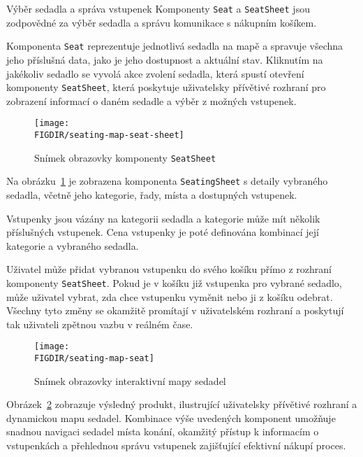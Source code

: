 \begin{subsection}{Výběr sedadla a správa vstupenek}
    \label{subsec:implementace-seating-seat}
    Komponenty \texttt{Seat} a \texttt{SeatSheet} jsou zodpovědné za výběr sedadla a správu komunikace s nákupním košíkem.

    Komponenta \texttt{Seat} reprezentuje jednotlivá sedadla na mapě a spravuje všechna jeho příslušná data, jako je jeho dostupnost a aktuální stav.
    Kliknutím na jakékoliv sedadlo se vyvolá akce zvolení sedadla, která spustí otevření komponenty \texttt{SeatSheet}, která poskytuje uživatelsky přívětivé rozhraní pro zobrazení informací o daném sedadle a výběr z možných vstupenek.

    \begin{figure}[h]
        \centering
        \texttt{[image: \\FIGDIR/seating-map-seat-sheet]}
        \caption{Snímek obrazovky komponenty \texttt{SeatSheet}}
        \label{fig:seating-map-seats-sheet}
    \end{figure}

    Na obrázku~\ref{fig:seating-map-seats-sheet} je zobrazena komponenta \texttt{SeatingSheet} s detaily vybraného sedadla, včetně jeho kategorie, řady, místa a dostupných vstupenek.

    Vstupenky jsou vázány na kategorii sedadla a kategorie může mít několik příslušných vstupenek.
    Cena vstupenky je poté definována kombinací její kategorie a vybraného sedadla.

    Uživatel může přidat vybranou vstupenku do svého košíku přímo z rozhraní komponenty \texttt{SeatSheet}.
    Pokud je v košíku již vstupenka pro vybrané sedadlo, může uživatel vybrat, zda chce vstupenku vyměnit nebo ji z košíku odebrat.
    Všechny tyto změny se okamžitě promítají v uživatelském rozhraní a poskytují tak uživateli zpětnou vazbu v reálném čase.

    \begin{figure}[h]
        \centering
        \texttt{[image: \\FIGDIR/seating-map-seat]}
        \caption{Snímek obrazovky interaktivní mapy sedadel}
        \label{fig:seating-map-seat}
    \end{figure}

    Obrázek~\ref{fig:seating-map-seat} zobrazuje výsledný produkt, ilustrující uživatelsky přívětivé rozhraní a dynamickou mapu sedadel.
    Kombinace výše uvedených komponent umožňuje snadnou navigaci sedadel místa konání, okamžitý přístup k informacím o vstupenkách a přehlednou správu vstupenek zajišťující efektivní nákupí proces.
\end{subsection}
